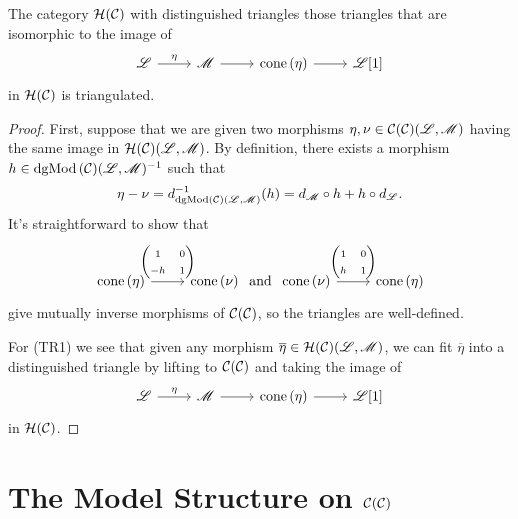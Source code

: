 \documentclass[dissertation.tex]{subfiles}
\begin{document}
\begin{prop}
  The category $\mathcal{H}(\mathcal{C})$ with distinguished triangles those triangles that are isomorphic to the image of
  $$\begin{tikzcd}
    \mathscr{L} \arrow{r}{\eta} & \mathscr{M} \arrow{r} & \cone{\eta} \arrow{r} & \mathscr{L}[1] 
  \end{tikzcd}$$
  in $\mathcal{H}(\mathcal{C})$ is triangulated.

  \begin{proof}
    First, suppose that we are given two morphisms $\eta, \nu \in \mathcal{C}(\mathcal{C})(\mathscr{L},\mathscr{M})$ having the same image in $\mathcal{H}(\mathcal{C})(\mathscr{L},\mathscr{M})$.
    By definition, there exists a morphism $h \in \operatorname{dgMod\left(\mathcal{C}\right)}(\mathscr{L},\mathscr{M})^{-1}$ such that 
    $$\eta - \nu = d_{\operatorname{dgMod\left(\mathcal{C}\right)}(\mathscr{L},\mathscr{M})}^{-1}(h) = d_\mathscr{M} \circ h + h \circ d_\mathscr{L}.$$
    It's straightforward to show that
    $$\begin{tikzcd}[ampersand replacement=\&]
      \cone{\eta} \arrow{r}{\left(\begin{matrix}1 & 0\\-h & 1\end{matrix}\right)} \& \cone{\nu}
    \end{tikzcd}
    \ \text{and}\ 
    \begin{tikzcd}[ampersand replacement=\&]
      \cone{\nu} \arrow{r}{\left(\begin{matrix}1 & 0\\h & 1\end{matrix}\right)} \& \cone{\eta}
    \end{tikzcd}$$
    give mutually inverse morphisms of $\mathcal{C}(\mathcal{C})$, so the triangles are well-defined.
    
    For (TR1) we see that given any morphism $\overline{\eta} \in \mathcal{H}(\mathcal{C})(\mathscr{L},\mathscr{M})$, we can fit $\overline{\eta}$ into a distinguished triangle by lifting to $\mathcal{C}(\mathcal{C})$ and taking the image of
    $$\begin{tikzcd}
      \mathscr{L} \arrow{r}{\eta} & \mathscr{M} \arrow{r} & \cone{\eta} \arrow{r} & \mathscr{L}[1]
    \end{tikzcd}$$
    in $\mathcal{H}(\mathcal{C})$.
  \end{proof}
\end{prop}
\section{The Model Structure on $\mathcal{C}(\mathcal{C})$}
\end{document}
